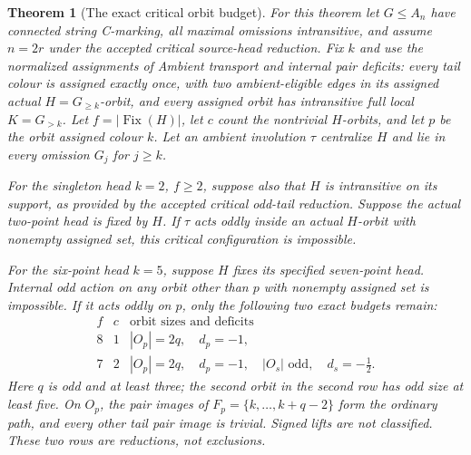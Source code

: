 \documentclass[11pt,a4paper]{article}
\newtheorem{theorem}[lemma]{Theorem}
\begin{document}
\begin{theorem}[The exact critical orbit budget]\label{budget}
For this theorem let $G\le A_n$ have connected string C-marking,
all maximal omissions intransitive, and assume $n=2r$ under the
accepted critical source-head reduction. Fix $k$ and use the
normalized assignments of
\emph{Ambient transport and internal pair deficits}: every tail
colour is assigned exactly once, with two ambient-eligible edges
in its assigned actual $H=G_{\ge k}$-orbit, and every assigned
orbit has intransitive full local $K=G_{>k}$.
Let $f=|\operatorname{Fix}(H)|$, let $c$ count the nontrivial
$H$-orbits, and let $p$ be the orbit assigned colour $k$.
Let an ambient involution $\tau$ centralize $H$ and lie in every
omission $G_j$ for $j\ge k$.

For the singleton head $k=2$, $f\ge2$, suppose also that $H$
is intransitive on its support, as provided by the accepted
critical odd-tail reduction. Suppose the actual two-point head is fixed by $H$.
If $\tau$ acts oddly inside an actual $H$-orbit with nonempty
assigned set, this critical configuration is impossible.

For the six-point head $k=5$, suppose $H$ fixes its specified
seven-point head. Internal odd action on any orbit other than $p$
with nonempty assigned set is impossible. If it acts oddly on $p$,
only the following two exact budgets remain:
\[
\begin{array}{c|c|l}
f&c&\text{orbit sizes and deficits}\\\hline
8&1&|O_p|=2q,\quad d_p=-1,\\
7&2&|O_p|=2q,\quad d_p=-1,\quad
 |O_s|\text{ odd},\quad d_s=-\tfrac12.
\end{array}                                                     \tag{2}
\]
Here $q$ is odd and at least three; the second orbit in the
second row has odd size at least five. On $O_p$, the pair images
of $F_p=\{k,\ldots,k+q-2\}$ form the ordinary path, and every
other tail pair image is trivial. Signed lifts are not classified.
These two rows are reductions, not exclusions.
\end{theorem}
\end{document}
